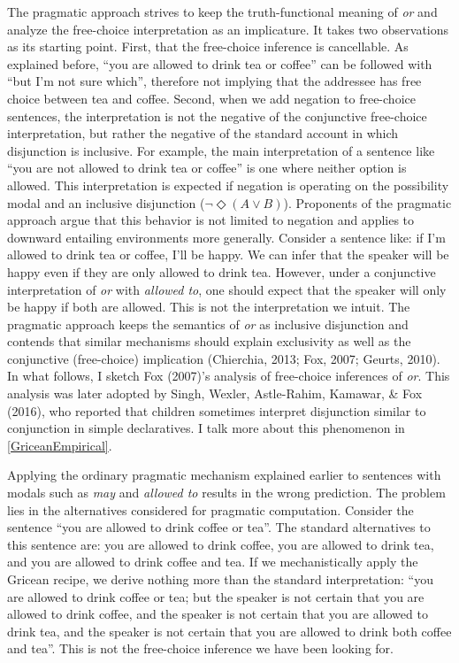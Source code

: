 \documentclass[oneside]{report}
\theoremstyle{definition}
\theoremstyle{definition}
\theoremstyle{definition}
\theoremstyle{remark}
\begin{document}
The pragmatic approach strives to keep the truth-functional meaning of
\emph{or} and analyze the free-choice interpretation as an implicature.
It takes two observations as its starting point. First, that the
free-choice inference is cancellable. As explained before, ``you are
allowed to drink tea or coffee'' can be followed with ``but I'm not sure
which'', therefore not implying that the addressee has free choice
between tea and coffee. Second, when we add negation to free-choice
sentences, the interpretation is not the negative of the conjunctive
free-choice interpretation, but rather the negative of the standard
account in which disjunction is inclusive. For example, the main
interpretation of a sentence like ``you are not allowed to drink tea or
coffee'' is one where neither option is allowed. This interpretation is
expected if negation is operating on the possibility modal and an
inclusive disjunction (\(\lnot \Diamond (A \lor B)\)). Proponents of the
pragmatic approach argue that this behavior is not limited to negation
and applies to downward entailing environments more generally. Consider
a sentence like: if I'm allowed to drink tea or coffee, I'll be happy.
We can infer that the speaker will be happy even if they are only
allowed to drink tea. However, under a conjunctive interpretation of
\emph{or} with \emph{allowed to}, one should expect that the speaker
will only be happy if both are allowed. This is not the interpretation
we intuit. The pragmatic approach keeps the semantics of \emph{or} as
inclusive disjunction and contends that similar mechanisms should
explain exclusivity as well as the conjunctive (free-choice) implication
(Chierchia, 2013; Fox, 2007; Geurts, 2010). In what follows, I sketch
Fox (2007)'s analysis of free-choice inferences of \emph{or}. This
analysis was later adopted by Singh, Wexler, Astle-Rahim, Kamawar, \&
Fox (2016), who reported that children sometimes interpret disjunction
similar to conjunction in simple declaratives. I talk more about this
phenomenon in \ref{GriceanEmpirical}.

Applying the ordinary pragmatic mechanism explained earlier to sentences
with modals such as \emph{may} and \emph{allowed to} results in the
wrong prediction. The problem lies in the alternatives considered for
pragmatic computation. Consider the sentence ``you are allowed to drink
coffee or tea''. The standard alternatives to this sentence are: you are
allowed to drink coffee, you are allowed to drink tea, and you are
allowed to drink coffee and tea. If we mechanistically apply the Gricean
recipe, we derive nothing more than the standard interpretation: ``you
are allowed to drink coffee or tea; but the speaker is not certain that
you are allowed to drink coffee, and the speaker is not certain that you
are allowed to drink tea, and the speaker is not certain that you are
allowed to drink both coffee and tea''. This is not the free-choice
inference we have been looking for.
\end{document}
